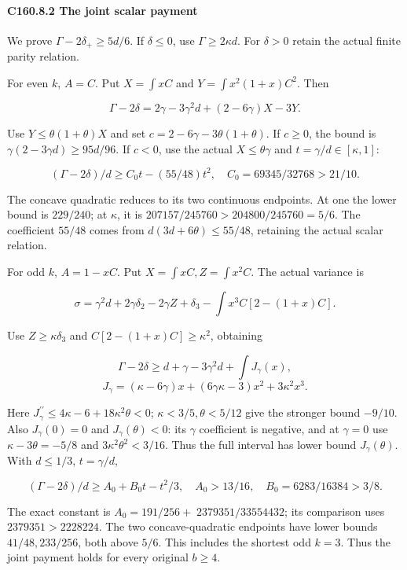 \paragraph{C160.8.2 The joint scalar payment}

We prove \(\Gamma-2\delta_+\ge5d/6\). If \(\delta\le0\), use \(\Gamma\ge2\kappa d\). For \(\delta>0\) retain the actual finite parity relation.

For even \(k\), \(A=C\). Put \(X=\int xC\) and \(Y=\int x^2(1+x)C^2\). Then

\[
\Gamma-2\delta=2\gamma-3\gamma^2d+(2-6\gamma)X-3Y.
\]

Use \(Y\le\theta(1+\theta)X\) and set \(c=2-6\gamma-3\theta(1+\theta)\). If \(c\ge0\), the bound is \(\gamma(2-3\gamma d)\ge95d/96\). If \(c<0\), use the actual \(X\le\theta\gamma\) and \(t=\gamma/d\in[\kappa,\allowbreak \allowbreak  1]\):

\[
(\Gamma-2\delta)/d\ge C_0t-(55/48)t^2,
\quad C_0=69345/32768>21/10.
\]

The concave quadratic reduces to its two continuous endpoints. At one the lower bound is \(229/240\); at \(\kappa\), it is \(207157/245760>204800/245760=5/6\). The coefficient \(55/48\) comes from \(d(3d+6\theta)\le55/48\), retaining the actual scalar relation.

For odd \(k\), \(A=1-xC\). Put \(X=\int xC,\allowbreak \allowbreak  Z=\int x^2C\). The actual variance is

\[
\sigma=\gamma^2d+2\gamma \delta_2-2\gamma Z+\delta_3
-\int x^3C[2-(1+x)C].
\]

Use \(Z\ge\kappa \delta_3\) and \(C[2-(1+x)C]\ge\kappa^2\), obtaining

\[
\Gamma-2\delta\ge d+\gamma-3\gamma^2d+\int J_\gamma(x),
\]
\[
J_\gamma=(\kappa-6\gamma)x+(6\gamma\kappa-3)x^2+3\kappa^2x^3.
\]

Here \(J_\gamma^{\prime\prime}\le4\kappa-6+18\kappa^2\theta<0\); \(\kappa<3/5,\allowbreak \allowbreak  \theta<5/12\) give the stronger bound \(-9/10\). Also \(J_\gamma(0)=0\) and \(J_\gamma(\theta)<0\): its \(\gamma\) coefficient is negative, and at \(\gamma=0\) use \(\kappa-3\theta=-5/8\) and \(3\kappa^2\theta^2<3/16\). Thus the full interval has lower bound \(J_\gamma(\theta)\). With \(d\le1/3\), \(t=\gamma/d\),

\[
(\Gamma-2\delta)/d\ge A_0+B_0t-t^2/3,
\quad A_0>13/16,\quad B_0=6283/16384>3/8.
\]

The exact constant is \(A_0=191/256+\;2379351/33554432\); its comparison uses \(2379351>2228224\). The two concave-quadratic endpoints have lower bounds \(41/48,\allowbreak \allowbreak  233/256\), both above \(5/6\). This includes the shortest odd \(k=3\). Thus the joint payment holds for every original \(b\ge4\).


